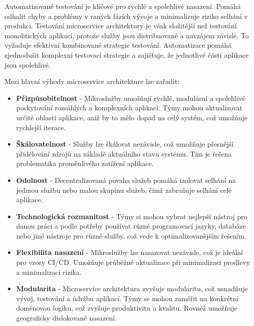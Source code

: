 Automatizované testování je klíčové pro rychlé a spolehlivé nasazení. Pomáhá odhalit chyby a problémy v raných fázích vývoje a minimalizuje riziko selhání v produkci. Testování microservice architektury je však složitější než testování monolitických aplikací, protože služby jsou distribuované a navzájem závislé. To vyžaduje efektivní kombinované strategie testování. Automatizace pomáhá zjednodušit komplexní testovací strategie a zajišťuje, že jednotlivé části aplikace jsou spolehlivé.


Mezi hlavní výhody microservice architekture lze zařadit:

\begin{itemize}

\item \textbf{Přizpůsobitelnost} - Mikroslužby umožňují rychlé, modulární a spolehlivé poskytování rozsáhlých a komplexních aplikací. Týmy mohou aktualizovat určité oblasti aplikace, aniž by to mělo dopad na celý systém, což umožňuje rychlejší iterace.

\item \textbf{Škálovatelnost} - Služby lze škálovat nezávisle, což umožňuje přesnější přidělování zdrojů na základě aktuálního stavu systému. Tím je řešena problematika proměnlivého zatížení aplikace.

\item \textbf{Odolnost} - Decentralizovaná povaha služeb pomáhá izolovat selhání na jedinou službu nebo malou skupinu služeb, čímž zabraňuje selhání celé aplikace.

\item \textbf{Technologická rozmanitost} - Týmy si mohou vybrat nejlepší nástroj pro danou práci a podle potřeby používat různé programovací jazyky, databáze nebo jiné nástroje pro různé služby, což vede k optimalizovanějším řešením.

\item \textbf{Flexibilita nasazení} - Mikroslužby lze nasazovat nezávisle, což je ideální pro vzory CI/CD. Umožňuje průběžné aktualizace při minimalizaci prodlevy a minimalizaci rizika.

\item \textbf{Modularita} - Microservice architektura zvyšuje modularitu, což usnadňuje vývoj, testování a údržbu aplikací. Týmy se mohou zaměřit na konkrétní doménovou logiku, což zvyšuje produktivitu a kvalitu. Rovněž umožňuje geograficky dislokované nasazení.

\end{itemize}

